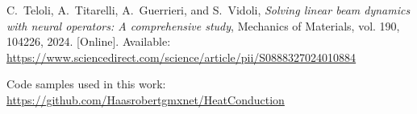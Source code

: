 \documentclass[a4paper,11pt]{article}
\begin{document}
\begin{thebibliography}{9}
C.~Teloli, A.~Titarelli, A.~Guerrieri, and S.~Vidoli, 
\emph{Solving linear beam dynamics with neural operators: A comprehensive study}, 
Mechanics of Materials, vol. 190, 104226, 2024. [Online]. Available: \url{https://www.sciencedirect.com/science/article/pii/S0888327024010884}

\begin{comment}
\bibitem{timoshenko1951theory}
S.~P. Timoshenko and J.~M. Gere, 
\emph{Theory of Elastic Stability}, 
2nd ed., McGraw-Hill, New York, 1961.
\end{comment}

Code samples used in this work: \url{https://github.com/Haasrobertgmxnet/HeatConduction}

\end{thebibliography}


\newpage

\end{document}
